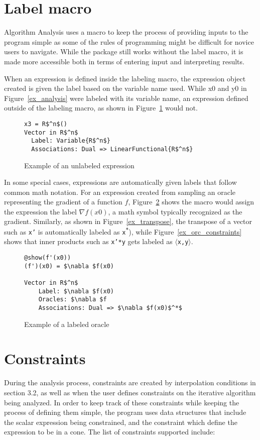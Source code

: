 \section{Label macro}
Algorithm Analysis uses a macro to keep the process of providing inputs to the program simple as some of the rules of programming might be difficult for novice users to navigate. While the package still works without the label macro, it is made more accessible both in terms of entering input and interpreting results.

When an expression is defined inside the labeling macro, the expression object created is given the label based on the variable name used.	While x0 and y0 in Figure~\ref{ex_analysis} were labeled with its variable name, an expression defined outside of the labeling macro, as shown in Figure~\ref{ex_unlabeled} would not.
	\begin{figure}[!h]
		\begin{lstlisting}[mathescape]
x3 = R$^n$()
Vector in R$^n$
  Label: Variable{R$^n$}
  Associations: Dual => LinearFunctional{R$^n$}
\end{lstlisting}
\caption{Example of an unlabeled expression}
\label{ex_unlabeled}
\end{figure}
	In some special cases, expressions are automatically given labels that follow common math notation. For an expression created from sampling an oracle representing the gradient of a function $f$, Figure~\ref{ex_labeled} shows the macro would assign the expression the label $\nabla f(x0)$, a math symbol typically recognized as the gradient. Similarly, as shown in Figure~\ref{ex_transpose}, the transpose of a vector such as \texttt{x'} is automatically labeled as \texttt{x\textsuperscript{*}}), while Figure~\ref{ex_orc_constraints} shows that inner products such as \texttt{x'*y} gets labeled as \texttt{$\langle$x,y$\rangle$}.
	\begin{figure}[!h]
		\begin{lstlisting}[mathescape]
@show(f'(x0))
(f')(x0) = $\nabla $f(x0)

Vector in R$^n$
	Label: $\nabla $f(x0)
	Oracles: $\nabla $f
	Associations: Dual => $\nabla $f(x0)$^*$
		\end{lstlisting}
		\caption{Example of a labeled oracle}
		\label{ex_labeled}
	\end{figure}

\section{Constraints}
During the analysis process, constraints are created by interpolation conditions in section 3.2, as well as when the user defines constraints on the iterative algorithm being analyzed. In order to keep track of these constraints while keeping the process of defining them simple, the program uses data structures that include the scalar expression being constrained, and the constraint which define the expression to be in a cone. The list of constraints supported include:

